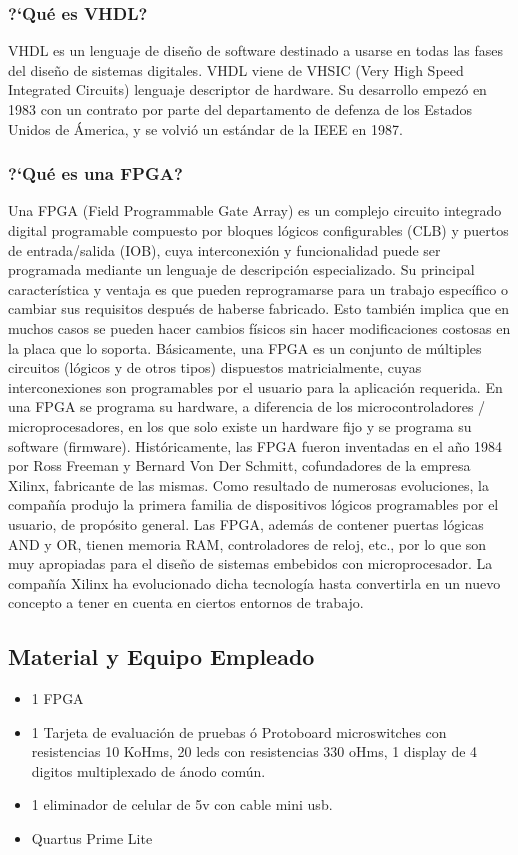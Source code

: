 	\subsubsection{?`Qu\'e es VHDL?}
		VHDL es un lenguaje de dise\~no de software destinado a usarse en todas las fases del dise\~no de sistemas digitales. VHDL viene de VHSIC (Very High Speed Integrated Circuits) lenguaje descriptor de hardware. Su desarrollo empez\'o en 1983 con un contrato por parte del departamento de defenza de los Estados Unidos de \'America, y se volvi\'o un est\'andar de la IEEE en 1987.
	\subsubsection{?`Qu\'e es una FPGA?}
Una FPGA (Field Programmable Gate Array) es un complejo circuito integrado digital programable compuesto por bloques l\'ogicos configurables (CLB) y puertos de entrada/salida (IOB), cuya interconexi\'on y funcionalidad puede ser programada mediante un lenguaje de descripci\'on especializado.
\vskip 1pt
Su principal caracter\'istica y ventaja es que pueden reprogramarse para un trabajo espec\'ifico o cambiar sus requisitos despu\'es de haberse fabricado. Esto tambi\'en implica que en muchos casos se pueden hacer cambios f\'isicos sin hacer modificaciones costosas en la placa que lo soporta.
\vskip 1pt
B\'asicamente, una FPGA es un conjunto de m\'ultiples circuitos (l\'ogicos y de otros tipos) dispuestos matricialmente, cuyas interconexiones son programables por el usuario para la aplicaci\'on requerida. En una FPGA se programa su hardware, a diferencia de los microcontroladores / microprocesadores, en los que solo existe un hardware fijo y se programa su software (firmware).
\vskip 1pt
Hist\'oricamente, las FPGA fueron inventadas en el a\~no 1984 por Ross Freeman y Bernard Von Der Schmitt, cofundadores de la empresa Xilinx, fabricante de las mismas. Como resultado de numerosas evoluciones, la compa\~n\'ia produjo la primera familia de dispositivos l\'ogicos programables por el usuario, de prop\'osito general.
\vskip 1pt
Las FPGA, adem\'as de contener puertas l\'ogicas AND y OR, tienen memoria RAM, controladores de reloj, etc., por lo que son muy apropiadas para el dise\~no de sistemas embebidos con microprocesador. La compa\~n\'ia Xilinx ha evolucionado dicha tecnolog\'ia hasta convertirla en un nuevo concepto a tener en cuenta en ciertos entornos de trabajo.
	\subsection{Material y Equipo Empleado}
		\begin{itemize}
			\item 1 FPGA
			\item 1 Tarjeta de evaluaci\'on de pruebas \'o Protoboard microswitches con resistencias 10 KoHms, 20 leds con resistencias 330 oHms, 1 display de 4 digitos multiplexado de \'anodo com\'un.
			\item 1 eliminador de celular de 5v con cable mini usb.
			\item Quartus Prime Lite
		\end{itemize}
	